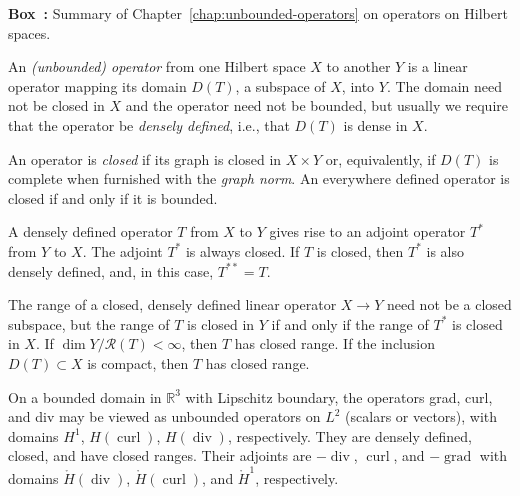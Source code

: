 \begin{tcolorbox}[enhanced,breakable,colback=KuangNei,frame hidden,boxrule=0pt,sharpish corners,before skip=10pt,after skip=10pt]
\label{box:unbounded-operators-summary}
\noindent\textbf{Box~\thebooksummary:} {Summary of Chapter~\ref{chap:unbounded-operators} on operators on Hilbert spaces.}\par

{An \emph{(unbounded) operator} from one Hilbert space $X$ to another $Y$ is a linear operator mapping its domain $D(T)$, a subspace of $X$, into $Y$. The domain need not be closed in $X$ and the operator need not be bounded, but usually we require that the operator be \emph{densely defined}, i.e., that $D(T)$ is dense in $X$.}

{An operator is \emph{closed} if its graph is closed in $X\times Y$ or, equivalently, if $D(T)$ is complete when furnished with the \emph{graph norm}. An everywhere defined operator is closed if and only if it is bounded.}

{A densely defined operator $T$ from $X$ to $Y$ gives rise to an adjoint operator $T^*$ from $Y$ to $X$. The adjoint $T^*$ is always closed. If $T$ is closed, then $T^*$ is also densely defined, and, in this case, $T^{**}=T$.}

{The range of a closed, densely defined linear operator $X\to Y$ need not be a closed subspace, but the range of $T$ is closed in $Y$ if and only if the range of $T^*$ is closed in $X$. If $\dim Y/\mathcal R(T)<\infty$, then $T$ has closed range. If the inclusion $D(T)\subset X$ is compact, then $T$ has closed range.}

{On a bounded domain in $\mathbb R^3$ with Lipschitz boundary, the operators grad, curl, and div may be viewed as unbounded operators on $L^2$ (scalars or vectors), with domains $H^1$, $H(\operatorname{curl})$, $H(\operatorname{div})$, respectively. They are densely defined, closed, and have closed ranges. Their adjoints are $-\operatorname{div}$, $\operatorname{curl}$, and $-\operatorname{grad}$ with domains $\mathring H(\operatorname{div})$, $\mathring H(\operatorname{curl})$, and $\mathring H^1$, respectively.}
\end{tcolorbox}
